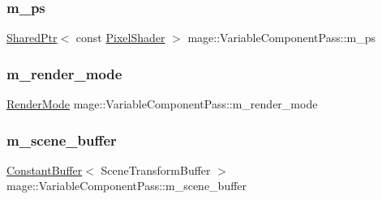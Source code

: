 \subsubsection{\texorpdfstring{m\+\_\+ps}{m\_ps}}
{\footnotesize\ttfamily \hyperlink{namespacemage_a1e01ae66713838a7a67d30e44c67703e}{Shared\+Ptr}$<$ const \hyperlink{namespacemage_ac98506b7edd999ea43ec46fbd0330238}{Pixel\+Shader} $>$ mage\+::\+Variable\+Component\+Pass\+::m\+\_\+ps\hspace{0.3cm}{\ttfamily [private]}}

\hypertarget{classmage_1_1_variable_component_pass_a6e9a67c5251951f887d64c1a6d50a33c}{}\label{classmage_1_1_variable_component_pass_a6e9a67c5251951f887d64c1a6d50a33c} 
\subsubsection{\texorpdfstring{m\+\_\+render\+\_\+mode}{m\_render\_mode}}
{\footnotesize\ttfamily \hyperlink{namespacemage_a5e7e18b0154373ce8fc942fe3f6b27fd}{Render\+Mode} mage\+::\+Variable\+Component\+Pass\+::m\+\_\+render\+\_\+mode\hspace{0.3cm}{\ttfamily [private]}}

\hypertarget{classmage_1_1_variable_component_pass_a80eb6a13a4bb5ce8ca197a3a8eddd061}{}\label{classmage_1_1_variable_component_pass_a80eb6a13a4bb5ce8ca197a3a8eddd061} 
\subsubsection{\texorpdfstring{m\+\_\+scene\+\_\+buffer}{m\_scene\_buffer}}
{\footnotesize\ttfamily \hyperlink{structmage_1_1_constant_buffer}{Constant\+Buffer}$<$ Scene\+Transform\+Buffer $>$ mage\+::\+Variable\+Component\+Pass\+::m\+\_\+scene\+\_\+buffer\hspace{0.3cm}{\ttfamily [private]}}

\hypertarget{classmage_1_1_variable_component_pass_afc290392240d6e9af2ba3027b992f53d}{}\label{classmage_1_1_variable_component_pass_afc290392240d6e9af2ba3027b992f53d} 
